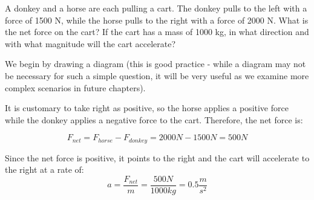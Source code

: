 \begin{Worked}
\begin{Problem}
A donkey and a horse are each pulling a cart. The donkey pulls 
to the left with a force of 1500 N, while the horse pulls to the right with a 
force of 2000 N. What is the net force on the cart? If the cart has a mass of 
1000 kg, in what direction and with what magnitude will the cart accelerate?
\end{Problem}
\begin{Solution}
We begin by drawing a diagram (this is good practice - while 
a diagram may not be necessary for such a simple question, it will be very useful 
as we examine more complex scenarios in future chapters). 

\begin{center}
\end{center}

It is customary to take right as positive, so the horse applies a positive force 
while the donkey applies a negative force to the cart. Therefore, the net force 
is:

$$F_{net} = F_{horse} - F_{donkey} = 2000N - 1500N = 500N$$

Since the net force is positive, it points to the right and the cart will 
accelerate to the right at a rate of:
$$a = \frac{F_{net}}{m} = \frac{500 N}{1000 kg} = 0.5 \frac{m}{s^2}$$
\end{Solution}
\end{Worked}

